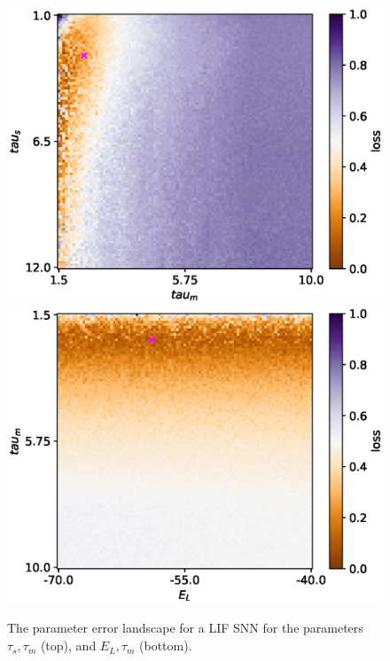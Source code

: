 \documentclass[mphil,deptreport,ianc]{infthesis} %
\begin{document}
\begin{figure}
    \centering
    \vskip -0.1in
    \includegraphics[width=0.7\columnwidth]{figures/param_landscape_heatmaps/LIF/test_export_2d_heatmap_N_4_loss_tau_m_tau_s.eps}
    \includegraphics[width=0.7\columnwidth]{figures/param_landscape_heatmaps/LIF/test_export_2d_heatmap_N_4_loss_E_L_tau_m.eps}
    \vskip -0.1in
    \caption{The parameter error landscape for a LIF SNN for the parameters $\tau_s, \tau_m$ (top), and $E_L, \tau_m$ (bottom).}
    \label{fig:p_landscape_hmap_LIF}
\end{figure}




\end{document}
